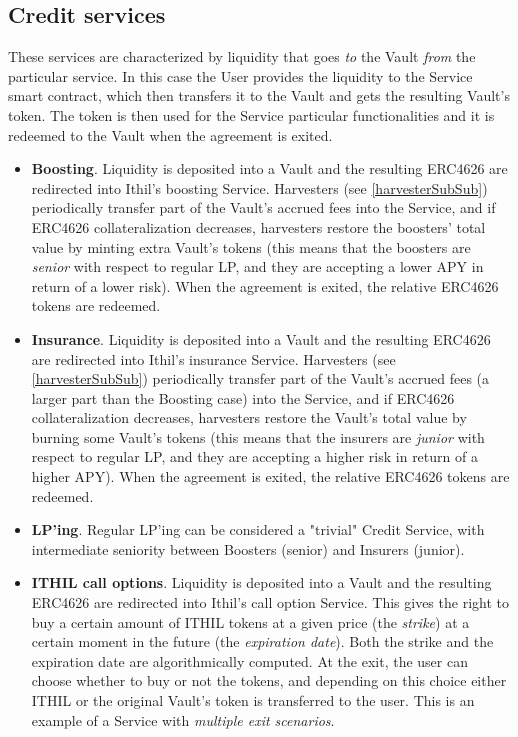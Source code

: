 \documentclass[a4paper,10 pt]{article}
\theoremstyle{definition}
\begin{document}
\subsection{Credit services}

These services are characterized by liquidity that goes {\it to} the Vault {\it from} the particular service. In this case the User provides the liquidity to the Service smart contract, which then transfers it to the Vault and gets the resulting Vault's token. The token is then used for the Service particular functionalities and it is redeemed to the Vault when the agreement is exited.

\begin{itemize}
\item {\bf Boosting}. Liquidity is deposited into a Vault and the resulting ERC4626 are redirected into Ithil's boosting Service. Harvesters (see \ref{harvesterSubSub}) periodically transfer part of the Vault's accrued fees into the Service, and if ERC4626 collateralization decreases, harvesters restore the boosters' total value by minting extra Vault's tokens (this means that the boosters are {\it senior} with respect to regular LP, and they are accepting a lower APY in return of a lower risk). When the agreement is exited, the relative ERC4626 tokens are redeemed.

\item {\bf Insurance}. Liquidity is deposited  into a Vault and the resulting ERC4626 are redirected into Ithil's insurance Service.  Harvesters (see \ref{harvesterSubSub}) periodically transfer part of the Vault's accrued fees (a larger part than the Boosting case) into the Service,  and if ERC4626 collateralization decreases, harvesters restore the Vault's total value by burning some Vault's tokens  (this means that the insurers are {\it junior} with respect to regular LP, and they are accepting a higher risk in return of a higher APY). When the agreement is exited, the relative ERC4626 tokens are redeemed.

\item {\bf LP'ing}. Regular LP'ing can be considered a "trivial" Credit Service, with intermediate seniority between Boosters (senior) and Insurers (junior).

\item {\bf ITHIL call options}. Liquidity is deposited  into a Vault and the resulting ERC4626 are redirected into Ithil's call option Service. This gives the right to buy a certain amount of ITHIL tokens at a given price (the {\it strike}) at a certain moment in the future (the {\it expiration date}). Both the strike and the expiration date are algorithmically computed. At the exit, the user can choose whether to buy or not the tokens, and depending on this choice either ITHIL or the original Vault's token is transferred to the user. This is an example of a Service with {\it multiple exit scenarios}.


\end{itemize}
\end{document}
